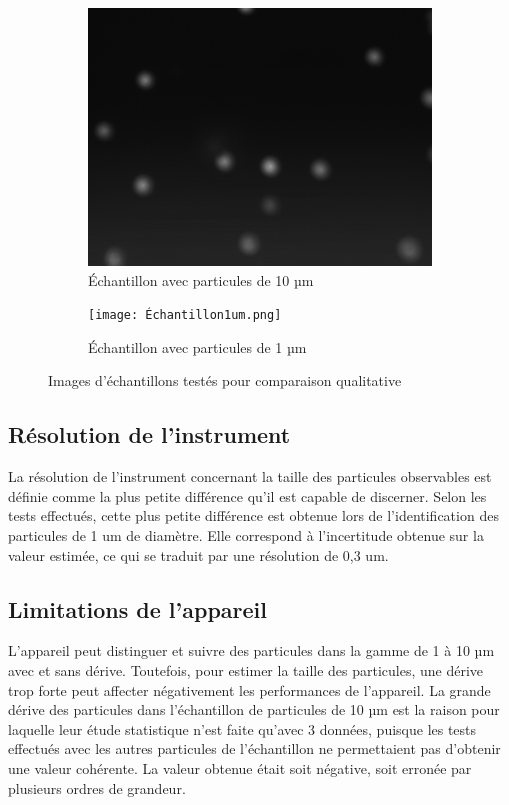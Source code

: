 \documentclass[11pt,letterpaper]{article}
\begin{document}
\begin{figure}[H]
  \begin{subfigure}[H]{0.45\textwidth}
    \centering
    \includegraphics[width=\textwidth]{essai_10um_2im_100ms.png}
    \caption{Échantillon avec particules de 10 µm}
  \end{subfigure}
  \hfill
  \begin{subfigure}[H]{0.45\textwidth}
    \centering
    \texttt{[image: Échantillon1um.png]}
    \caption{Échantillon avec particules de 1 µm}
  \end{subfigure}
  \caption{Images d'échantillons testés pour comparaison qualitative}
\end{figure}

\subsection{Résolution de l'instrument}

La résolution de l'instrument concernant la taille des particules observables est définie
comme la plus petite différence qu'il est capable de discerner. Selon les tests effectués, 
cette plus petite différence est obtenue lors de l'identification des particules de 1 um 
de diamètre. Elle correspond à l'incertitude obtenue sur la valeur estimée, ce qui se traduit
par une résolution de 0,3 um. 

\subsection{Limitations de l'appareil}

L'appareil peut distinguer et suivre des particules dans la gamme de 1 à 10 µm avec et sans dérive.
Toutefois, pour estimer la taille des particules, une dérive trop forte peut affecter négativement 
les performances de l'appareil. La grande dérive des particules dans l'échantillon de particules 
de 10 µm est la raison pour laquelle leur étude statistique n'est faite qu'avec 3 données, puisque 
les tests effectués avec les autres particules de l'échantillon ne permettaient pas d'obtenir une 
valeur cohérente. La valeur obtenue était soit négative, soit erronée par plusieurs ordres de grandeur.
\end{document}
